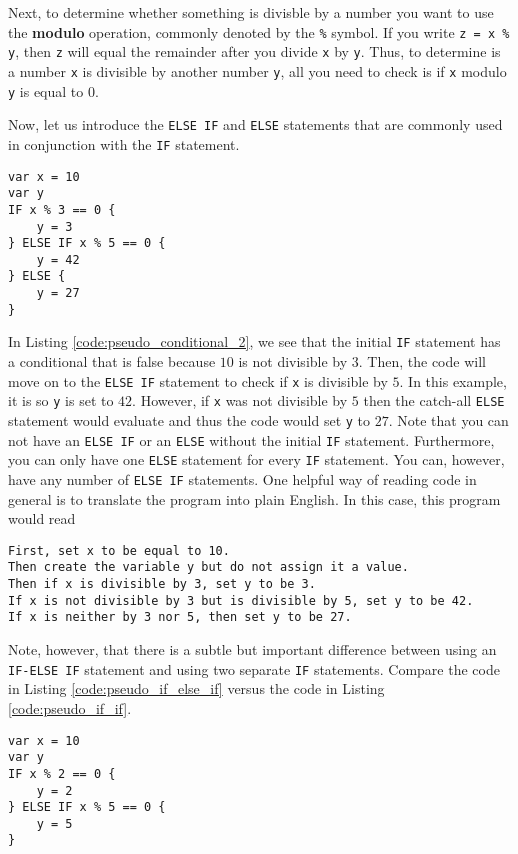 \documentclass{article}
\begin{document}
Next, to determine whether something is divisble by a number you want to use the \textbf{modulo} operation, commonly denoted by the \lstinline{%} symbol.
If you write \lstinline{z = x % y}, then \lstinline{z} will equal the remainder after you divide \lstinline{x} by \lstinline{y}.
Thus, to determine is a number \lstinline{x} is divisible by another number \lstinline{y}, all you need to check is if \lstinline{x} modulo \lstinline{y} is equal to $0$.

Now, let us introduce the \lstinline{ELSE IF} and \lstinline{ELSE} statements that are commonly used in conjunction with the \lstinline{IF} statement.
\begin{lstlisting}[caption={A stereotypical IF-ELSE IF-ELSE statement.}, label={code:pseudo_conditional_2}]
var x = 10
var y
IF x % 3 == 0 {
    y = 3
} ELSE IF x % 5 == 0 {
    y = 42
} ELSE {
    y = 27
}
\end{lstlisting}
In Listing \ref{code:pseudo_conditional_2}, we see that the initial \lstinline{IF} statement has a conditional that is false because $10$ is not divisible by $3$.
Then, the code will move on to the \lstinline{ELSE IF} statement to check if \lstinline{x} is divisible by $5$.
In this example, it is so \lstinline{y} is set to $42$.
However, if \lstinline{x} was not divisible by $5$ then the catch-all \lstinline{ELSE} statement would evaluate and thus the code would set \lstinline{y} to $27$.
Note that you can not have an \lstinline{ELSE IF} or an \lstinline{ELSE} without the initial \lstinline{IF} statement.
Furthermore, you can only have one \lstinline{ELSE} statement for every \lstinline{IF} statement.
You can, however, have any number of \lstinline{ELSE IF} statements.
One helpful way of reading code in general is to translate the program into plain English.
In this case, this program would read
\begin{lstlisting}
First, set x to be equal to 10.
Then create the variable y but do not assign it a value.
Then if x is divisible by 3, set y to be 3.
If x is not divisible by 3 but is divisible by 5, set y to be 42.
If x is neither by 3 nor 5, then set y to be 27.
\end{lstlisting}

Note, however, that there is a subtle but important difference between using an \lstinline{IF-ELSE IF} statement and using two separate \lstinline{IF} statements.
Compare the code in Listing \ref{code:pseudo_if_else_if} versus the code in Listing \ref{code:pseudo_if_if}.

\begin{lstlisting}[caption={IF ELSE-IF.}, label={code:pseudo_if_else_if}]
var x = 10
var y
IF x % 2 == 0 {
    y = 2
} ELSE IF x % 5 == 0 {
    y = 5
}
\end{lstlisting}
\end{document}
